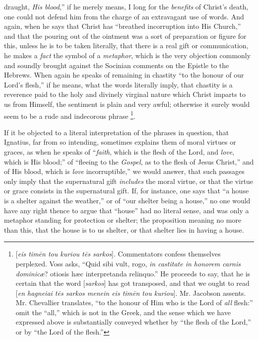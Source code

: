 draught, \emph{His blood},'' if he merely means, I long for the \emph{benefits}
of Christ's death, one could not defend him from the charge of an
extravagant use of words. And again, when he says that Christ has ``breathed
incorruption into His Church,'' and that the pouring out of the
ointment was a sort of preparation or figure for this, unless he is to
be taken literally, that there is a real gift or communication, he
makes a \emph{fact} the symbol of a \emph{metaphor}, which is the very
objection commonly and soundly brought against the Socinian comments
on the Epistle to the Hebrews. When again he speaks of remaining in
chastity ``to the honour of our Lord's flesh,'' if he means, what the
words literally imply, that chastity is a reverence paid to the holy
and divinely virginal nature which Christ imparts to us from
Himself, the sentiment is plain and very awful; otherwise it surely
would seem to be a rude and indecorous phrase \footnote{[\emph{eis tim\={e}n tou kuriou t\={e}s sarkos}]. Commentators
confess themselves perplexed. Voss asks, ``Quid sibi vult, rogo, \emph{in
castitate in honorem carnis dominicæ}? otiosis hæc interpretanda
relinquo.'' He proceeds to say, that he is certain that the word [\emph{sarkos}]
has got transposed, and that we ought to read [\emph{en hagneiai t\={e}s
sarkos menein eis tim\={e}n tou kuriou}]. Mr. Jacobson assents.
Mr. Chevallier translates, ``to the honour of Him who is the Lord of \emph{all}
flesh:'' omit the ``all,'' which is not in the Greek, and the sense which
we have expressed above is substantially conveyed whether by ``the
flesh of the Lord,'' or by ``the Lord of the flesh.''}.

If it be objected to a literal interpretation of
the phrases in question, that Ignatius, far from so intending,
sometimes explains them of moral virtues or graces, as when he speaks
of ``\emph{faith}, which is the flesh of the Lord, and \emph{love},
which is His blood;'' of ``fleeing to the \emph{Gospel}, as to the flesh
of Jesus Christ,'' and of His blood, which is \emph{love}
incorruptible,'' we would answer, that such passages only imply that
the supernatural gift \emph{includes} the moral virtue, or that the
virtue or grace consists in the supernatural gift. If, for instance,
one says that ``a house is a shelter against the weather,'' or of ``our
shelter being a house,'' no one would have any right thence to argue
that ``house'' had no literal sense, and was only a metaphor standing
for protection or shelter; the proposition meaning no more than this,
that the house is to us shelter, or that shelter lies in having a
house.

